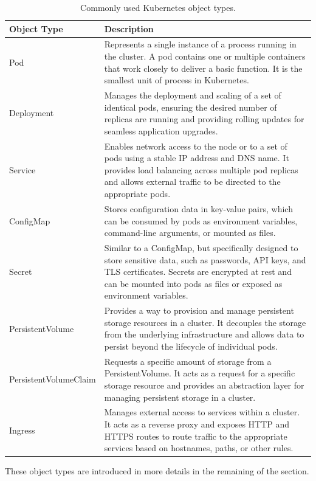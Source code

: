 \begin{table}[!htb]
	\centering
	\caption{Commonly used Kubernetes object types.} \label{ch:vac:tab:objtype}
	\begin{tabularx}{\textwidth}{lX}
		\hline
		Object Type & Description \\
		\hline
		Pod & Represents a single instance of a process running in the cluster. A pod contains one or multiple containers that work closely to deliver a basic function. It is the smallest unit of process in Kubernetes. \\ \hline
		Deployment & Manages the deployment and scaling of a set of identical pods, ensuring the desired number of replicas are running and providing rolling updates for seamless application upgrades. \\ \hline
		Service & Enables network access to the node or to a set of pods using a stable IP address and DNS name. It provides load balancing across multiple pod replicas and allows external traffic to be directed to the appropriate pods. \\ \hline
		ConfigMap & Stores configuration data in key-value pairs, which can be consumed by pods as environment variables, command-line arguments, or mounted as files. \\ \hline
		Secret & Similar to a ConfigMap, but specifically designed to store sensitive data, such as passwords, API keys, and TLS certificates. Secrets are encrypted at rest and can be mounted into pods as files or exposed as environment variables. \\ \hline
		PersistentVolume & Provides a way to provision and manage persistent storage resources in a cluster. It decouples the storage from the underlying infrastructure and allows data to persist beyond the lifecycle of individual pods. \\ \hline
		PersistentVolumeClaim & Requests a specific amount of storage from a PersistentVolume. It acts as a request for a specific storage resource and provides an abstraction layer for managing persistent storage in a cluster. \\ \hline
		Ingress & Manages external access to services within a cluster. It acts as a reverse proxy and exposes HTTP and HTTPS routes to route traffic to the appropriate services based on hostnames, paths, or other rules. \\
		\hline
	\end{tabularx}
\end{table}

These object types are introduced in more details in the remaining of the section.

